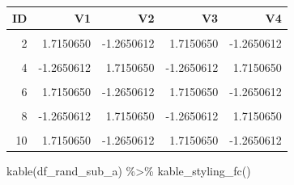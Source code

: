 \documentclass[
]{book}
\newenvironment{Shaded}{\begin{snugshade}}{\end{snugshade}}
\newcommand{\FunctionTok}[1]{\textcolor[rgb]{0.00,0.00,0.00}{#1}}
\newcommand{\NormalTok}[1]{#1}
\newcommand{\SpecialCharTok}[1]{\textcolor[rgb]{0.00,0.00,0.00}{#1}}
\begin{document}
\begin{table}[!h]
\centering
\begin{tabular}{r|r|r|r|r}
\hline
ID & V1 & V2 & V3 & V4\\
\hline
\cellcolor{gray!6}{1} & \cellcolor{gray!6}{0.1292877} & \cellcolor{gray!6}{0.4609162} & \cellcolor{gray!6}{0.1292877} & \cellcolor{gray!6}{0.4609162}\\
\hline
2 & 1.7150650 & -1.2650612 & 1.7150650 & -1.2650612\\
\hline
\cellcolor{gray!6}{3} & \cellcolor{gray!6}{0.4609162} & \cellcolor{gray!6}{0.1292877} & \cellcolor{gray!6}{0.4609162} & \cellcolor{gray!6}{0.1292877}\\
\hline
4 & -1.2650612 & 1.7150650 & -1.2650612 & 1.7150650\\
\hline
\cellcolor{gray!6}{5} & \cellcolor{gray!6}{0.1292877} & \cellcolor{gray!6}{0.4609162} & \cellcolor{gray!6}{0.1292877} & \cellcolor{gray!6}{0.4609162}\\
\hline
6 & 1.7150650 & -1.2650612 & 1.7150650 & -1.2650612\\
\hline
\cellcolor{gray!6}{7} & \cellcolor{gray!6}{0.4609162} & \cellcolor{gray!6}{0.1292877} & \cellcolor{gray!6}{0.4609162} & \cellcolor{gray!6}{0.1292877}\\
\hline
8 & -1.2650612 & 1.7150650 & -1.2650612 & 1.7150650\\
\hline
\cellcolor{gray!6}{9} & \cellcolor{gray!6}{0.1292877} & \cellcolor{gray!6}{0.4609162} & \cellcolor{gray!6}{0.1292877} & \cellcolor{gray!6}{0.4609162}\\
\hline
10 & 1.7150650 & -1.2650612 & 1.7150650 & -1.2650612\\
\hline
\end{tabular}
\end{table}

\begin{Shaded}
\begin{Highlighting}[]
\FunctionTok{kable}\NormalTok{(df\_rand\_sub\_a) }\SpecialCharTok{\%\textgreater{}\%} \FunctionTok{kable\_styling\_fc}\NormalTok{()}
\end{Highlighting}
\end{Shaded}
\end{document}
